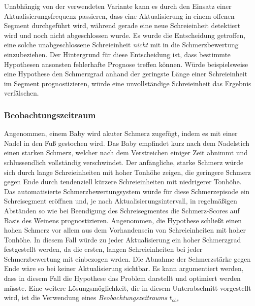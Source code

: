 Unabhängig von der verwendeten Variante kann es durch den Einsatz einer Aktualisierungsfrequenz passieren, dass eine Aktualisierung in einem offenen Segment durchgeführt wird, während gerade eine neue Schreieinheit detektiert wird und noch nicht abgeschlossen wurde. Es wurde die Entscheidung getroffen, eine solche unabgeschlossene Schreieinheit \emph{nicht} mit in die Schmerzbewertung einzubeziehen. Der Hintergrund für diese Entscheidung ist, dass bestimmte Hypothesen ansonsten fehlerhafte Prognose treffen können. Würde beispielsweise eine Hypothese den Schmerzgrad anhand der geringste Länge einer Schreieinheit im Segment prognostizieren, würde eine unvollständige Schreieinheit das Ergebnis verfälschen.
 
  
 \subsubsection{Beobachtungszeitraum}
 
Angenommen, einem Baby wird akuter Schmerz zugefügt, indem es mit einer Nadel in den Fuß gestochen wird. Das Baby empfindet kurz nach dem Nadelstich einen starken Schmerz, welcher nach dem Verstreichen einiger Zeit abnimmt und schlussendlich vollständig verschwindet. Der anfängliche, starke Schmerz würde sich durch lange Schreieinheiten mit hoher Tonhöhe zeigen, die geringere Schmerz gegen Ende durch tendenziell kürzere Schreieinheiten mit niedrigerer Tonhöhe.\cite{acutePainResponse} Das automatisierte Schmerzbewertungsystem würde für diese Schmerzepisode ein Schreisegment eröffnen und, je nach Aktualisierungsintervall, in regelmäßigen Abständen so wie bei Beendigung des Schreisegmentes die Schmerz-Scores auf Basis des Weinens prognostizieren. Angenommen, die Hypothese schließt einen hohen Schmerz vor allem aus dem Vorhandensein von Schreieinheiten mit hoher Tonhöhe. In diesem Fall würde zu jeder Aktualisierung ein hoher Schmerzgrad festgestellt werden, da die ersten, langen Schreieinheiten bei jeder Schmerzbewertung mit einbezogen wrden. Die Abnahme der Schmerzstärke gegen Ende wäre so bei keiner Aktualisierung sichtbar. Es kann argumentiert werden, dass in diesem Fall die Hypothese das Problem darstellt und optimiert werden müsste. Eine weitere Lösungsmöglichkeit, die in diesem Unterabschnitt vorgestellt wird, ist die Verwendung eines \emph{Beobachtungszeitraums} $t_{obs}$

